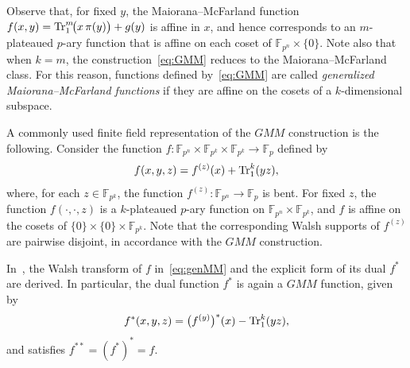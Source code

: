 \documentclass[12pt]{article}
\theoremstyle{plain}
\theoremstyle{definition}
\renewcommand{\to}{\rightarrow}
\newcommand{\Tr}{{\rm Tr}}
\begin{document}
	Observe that, for fixed \(y\), the Maiorana--McFarland function
	\(f(x,y) = \Tr_1^m\!\bigl(x\,\pi(y)\bigr) + g(y)\)
	is affine in \(x\), and hence corresponds to an \(m\)-plateaued \(p\)-ary function that is affine on each coset of \(\mathbb{F}_{p^n} \times \{0\}\).
	Note also that when \(k = m\), the construction~\eqref{eq:GMM} reduces to the
	Maiorana--McFarland class.
	For this reason, functions defined by~\eqref{eq:GMM} are called
	\emph{generalized Maiorana--McFarland functions} if they are affine on the cosets of a \(k\)-dimensional subspace.
	
	A commonly used finite field representation of the \(GMM\) construction is the
	following.
	Consider the function $f : \mathbb{F}_{p^n} \times \mathbb{F}_{p^k} \times \mathbb{F}_{p^k}
	\to \mathbb{F}_p$
	defined by
	\begin{align}\label{eq:genMM}
		f(x,y,z) = f^{(z)}(x) + \Tr_1^k(yz),  
	\end{align}
	where, for each \(z \in \mathbb{F}_{p^k}\), the function
	\(f^{(z)} : \mathbb{F}_{p^n} \to \mathbb{F}_p\) is bent.
	For fixed \(z\), the function \(f(\cdot,\cdot,z)\) is a \(k\)-plateaued
	\(p\)-ary function on
	\(\mathbb{F}_{p^n} \times \mathbb{F}_{p^k}\), and \(f\) is affine on the cosets of \(\{0\} \times \{0\} \times \mathbb{F}_{p^k}\).
	Note that the corresponding Walsh
	supports of \(f^{(z)}\) are pairwise disjoint, in accordance with the \(GMM\) construction.
	
	In~\cite[Theorem~3]{aakm25}, the Walsh transform of \(f\) in~\eqref{eq:genMM} and the explicit form of its dual \(f^{\ast}\) are derived. In particular, the dual function \(f^{\ast}\) is again a \(GMM\) function, given by
	\[
	f^{\ast}(x,y,z)
	=
	\bigl(f^{(y)}\bigr)^{\ast}(x)
	- \Tr_1^k(yz),
	\]
	and satisfies \(f^{\ast\ast} = (f^{\ast})^{\ast} = f\).
	
\end{document}
